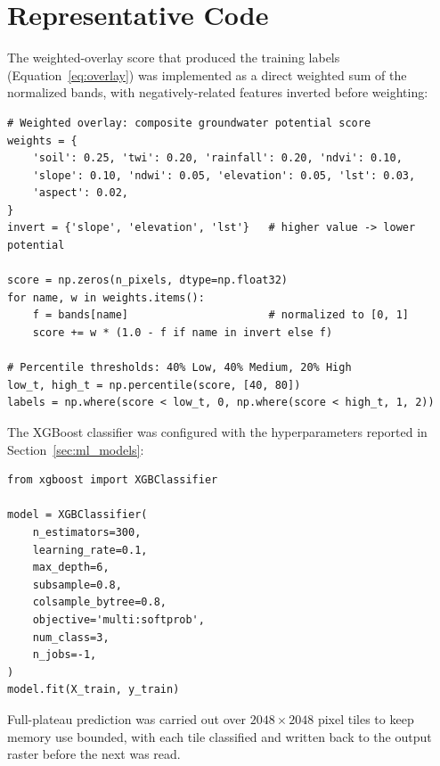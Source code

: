 \section{Representative Code}
\label{app:snippets}

The weighted-overlay score that produced the training labels
(Equation~\ref{eq:overlay}) was implemented as a direct weighted sum of the
normalized bands, with negatively-related features inverted before weighting:

\begin{verbatim}
# Weighted overlay: composite groundwater potential score
weights = {
    'soil': 0.25, 'twi': 0.20, 'rainfall': 0.20, 'ndvi': 0.10,
    'slope': 0.10, 'ndwi': 0.05, 'elevation': 0.05, 'lst': 0.03,
    'aspect': 0.02,
}
invert = {'slope', 'elevation', 'lst'}   # higher value -> lower potential

score = np.zeros(n_pixels, dtype=np.float32)
for name, w in weights.items():
    f = bands[name]                      # normalized to [0, 1]
    score += w * (1.0 - f if name in invert else f)

# Percentile thresholds: 40% Low, 40% Medium, 20% High
low_t, high_t = np.percentile(score, [40, 80])
labels = np.where(score < low_t, 0, np.where(score < high_t, 1, 2))
\end{verbatim}

The XGBoost classifier was configured with the hyperparameters reported in
Section~\ref{sec:ml_models}:

\begin{verbatim}
from xgboost import XGBClassifier

model = XGBClassifier(
    n_estimators=300,
    learning_rate=0.1,
    max_depth=6,
    subsample=0.8,
    colsample_bytree=0.8,
    objective='multi:softprob',
    num_class=3,
    n_jobs=-1,
)
model.fit(X_train, y_train)
\end{verbatim}

Full-plateau prediction was carried out over $2048 \times 2048$ pixel tiles to
keep memory use bounded, with each tile classified and written back to the output
raster before the next was read.
